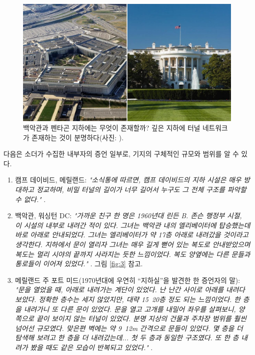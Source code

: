 \documentclass[10pt,twocolumn,letterpaper]{article}
\begin{document}
\begin{figure}[t]
\begin{center}
   \includegraphics[width=1\linewidth]{penta.jpg}
\end{center}
   \caption{백악관과 펜타곤 지하에는 무엇이 존재할까? 깊은 지하에 터널 네트워크가 존재하는 것이 분명하다(사진: \cite{31}).}
\label{fig:3}
\label{fig:onecol}
\end{figure}

다음은 소더가 수집한 내부자의 증언 일부로, 기지의 구체적인 규모와 범위를 알 수 있다.

\begin{flushleft}
\begin{enumerate}
    \item 캠프 데이비드, 메릴랜드: \textit{"소식통에 따르면, 캠프 데이비드의 지하 시설은 매우 방대하고 정교하며, 비밀 터널의 길이가 너무 길어서 누구도 그 전체 구조를 파악할 수 없다."} \cite{22}.
    \item 백악관, 워싱턴 DC: \textit{"가까운 친구 한 명은 1960년대 린든 B. 존슨 행정부 시절, 이 시설의 내부로 내려간 적이 있다. 그녀는 백악관 내의 엘리베이터에 탑승했는데 바로 아래로 안내되었다. 그녀는 엘리베이터가 약 17층 아래로 내려갔을 것이라고 생각한다. 지하에서 문이 열리자 그녀는 매우 길게 뻗어 있는 복도로 안내받았으며 복도는 멀리 시야의 끝까지 사라지는 듯한 느낌이었다. 복도 양옆에는 다른 문들과 통로들이 이어져 있었다."} \cite{22}. 그림 \ref{fig:3} 참고.
    \item 메릴랜드 주 포트 미드(1970년대에 우연히 “지하실”을 발견한 한 증언자의 말): \textit{"문을 열었을 때, 아래로 내려가는 계단이 있었다. 난 난간 사이로 아래를 내려다보았다. 정확한 층수는 세지 않았지만, 대략 15~20층 정도 되는 느낌이었다. 한 층을 내려가니 또 다른 문이 있었다. 문을 열고 고개를 내밀어 좌우를 살펴보니, 양쪽으로 끝이 보이지 않는 터널이 있었다. 분명 지상의 건물과 주차장 범위를 훨씬 넘어선 규모였다. 맞은편 벽에는 약 9~12m 간격으로 문들이 있었다. 몇 층을 더 탐색해 보려고 한 층을 더 내려갔는데... 첫 두 층과 동일한 구조였다. 또 한 층 내려가 봤을 때도 같은 모습이 반복되고 있었다."} \cite{22}.
\end{enumerate}
\end{flushleft}
\end{document}
